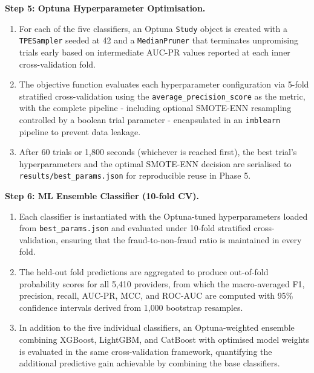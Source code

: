 \vspace{0.5em}
\noindent\textbf{Step 5: Optuna Hyperparameter Optimisation.}

\begin{enumerate}[label=\roman*.]
  \item For each of the five classifiers, an Optuna \texttt{Study} object is
  created with a \texttt{TPESampler} seeded at 42 and a
  \texttt{MedianPruner} that terminates unpromising trials early based on
  intermediate AUC-PR values reported at each inner cross-validation fold.
  \item The objective function evaluates each hyperparameter configuration via
  5-fold stratified cross-validation using the \texttt{average\_precision\_score}
  as the metric, with the complete pipeline - including optional SMOTE-ENN
  resampling controlled by a boolean trial parameter - encapsulated in an
  \texttt{imblearn} pipeline to prevent data leakage.
  \item After 60 trials or 1{,}800 seconds (whichever is reached first), the
  best trial's hyperparameters and the optimal SMOTE-ENN decision are serialised
  to \texttt{results/best\_params.json} for reproducible reuse in Phase 5.
\end{enumerate}

\vspace{0.5em}
\noindent\textbf{Step 6: ML Ensemble Classifier (10-fold CV).}

\begin{enumerate}[label=\roman*.]
  \item Each classifier is instantiated with the Optuna-tuned hyperparameters
  loaded from \texttt{best\_params.json} and evaluated under 10-fold stratified
  cross-validation, ensuring that the fraud-to-non-fraud ratio is maintained in
  every fold.
  \item The held-out fold predictions are aggregated to produce out-of-fold
  probability scores for all 5,410 providers, from which the macro-averaged F1,
  precision, recall, AUC-PR, MCC, and ROC-AUC are computed with 95\% confidence
  intervals derived from 1{,}000 bootstrap resamples.
  \item In addition to the five individual classifiers, an Optuna-weighted
  ensemble combining XGBoost, LightGBM, and CatBoost with optimised model
  weights is evaluated in the same cross-validation framework, quantifying
  the additional predictive gain achievable by combining the base classifiers.
\end{enumerate}


